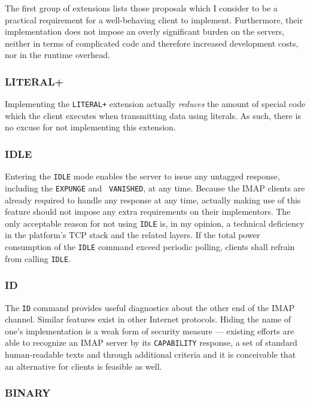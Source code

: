 \documentclass[trojita]{subfiles}
\begin{document}
The first group of extensions lists those proposals which I consider to be a practical requirement for a well-behaving
client to implement.  Furthermore, their implementation does not impose an overly significant burden on the servers,
neither in terms of complicated code and therefore increased development costs, nor in the runtime overhead.

\subsubsection{LITERAL+}

Implementing the {\tt LITERAL+} extension actually {\em reduces} the amount of special code which the client executes
when transmitting data using literals.  As such, there is no excuse for not implementing this extension.

\subsubsection{IDLE}

Entering the {\tt IDLE} mode enables the server to issue any untagged response, including the {\tt EXPUNGE} and {\tt
VANISHED}, at any time.  Because the IMAP clients are already required to handle any response at any time, actually
making use of this feature should not impose any extra requirements on their implementors.  The only acceptable reason
for not using {\tt IDLE} is, in my opinion, a technical deficiency in the platform's TCP stack and the related layers.
If the total power consumption of the {\tt IDLE} command exceed periodic polling, clients shall refrain from calling
{\tt IDLE}.

\subsubsection{ID}

The {\tt ID} command provides useful diagnostics about the other end of the IMAP channel.  Similar features exist in
other Internet protocols.  Hiding the name of one's implementation is a weak form of security measure --- existing
efforts \cite{openemailsurvey} are able to recognize an IMAP server by its {\tt CAPABILITY} response, a set of standard
human-readable texts and through additional criteria and it is conceivable that an alternative for clients is feasible
as well.

\subsubsection{BINARY}
\end{document}
